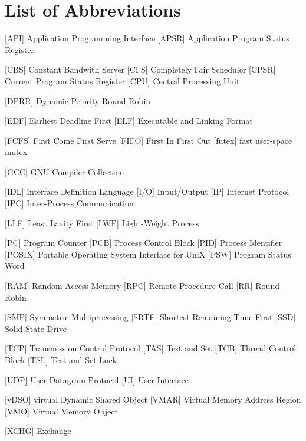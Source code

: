
\chapter*{List of Abbreviations}

\begin{acronym} [POSIX]
 [API] {Application Programming Interface}
 [APSR] {Application Program Status Register}

 [CBS] {Constant Bandwith Server}
 [CFS] {Completely Fair Scheduler}
 [CPSR] {Current Program Status Register}
 [CPU] {Central Processing Unit}

 [DPRR] {Dynamic Priority Round Robin}

 [EDF] {Earliest Deadline First}
 [ELF] {Executable and Linking Format}

 [FCFS] {First Come First Serve}
 [FIFO] {First In First Out}
 [futex] {fast user-space mutex}

 [GCC] {GNU Compiler Collection}


 [IDL] {Interface Definition Language}
 [I/O] {Input/Output}
 [IP] {Internet Protocol}
[IPC] {Inter-Process Communication}



 [LLF] {Least Laxity First}
 [LWP] {Light-Weight Process}




 [PC] {Program Counter}
 [PCB] {Process Control Block}
 [PID] {Process Identifier}
 [POSIX] {Portable Operating System Interface for UniX}
 [PSW] {Program Status Word}


  [RAM] {Random Access Memory}
 [RPC] {Remote Procedure Call}
 [RR] {Round Robin}

 [SMP] {Symmetric Multiprocessing}
 [SRTF] {Shortest Remaining Time First}
 [SSD] {Solid State Drive}

 [TCP] {Transmission Control Protocol}
 [TAS] {Test and Set}
 [TCB] {Thread Control Block}
 [TSL] {Test and Set Lock}

 [UDP] {User Datagram Protocol} 
  [UI]  {User Interface}

 [vDSO] {virtual Dynamic Shared Object}
 [VMAR] {Virtual Memory Address Region}
  [VMO]  {Virtual Memory Object}


 [XCHG] {Exchange}



\end{acronym} 
